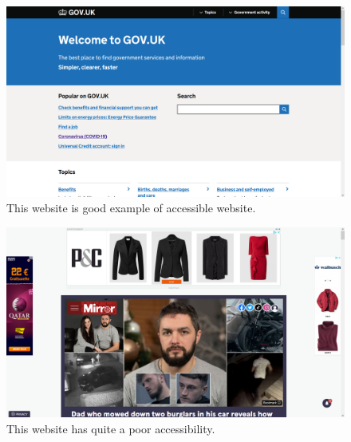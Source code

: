 \begin{figure}[tp]
    \centering
    \includegraphics[keepaspectratio,width=\linewidth,height=\halfh]
    {images/gov}
    
    \caption[www.gov.uk]
    {%
    This website is good example of accessible website.
    }
    \label{fig:mirror}
\end{figure}

\begin{figure}[tp]
    \centering
    \includegraphics[keepaspectratio,width=\linewidth,height=\halfh]
    {images/mirror}
    
    \caption[www.mirror.co.uk]
    {%
    This website has quite a poor accessibility.
    }
    \label{fig:mirror}
\end{figure}
